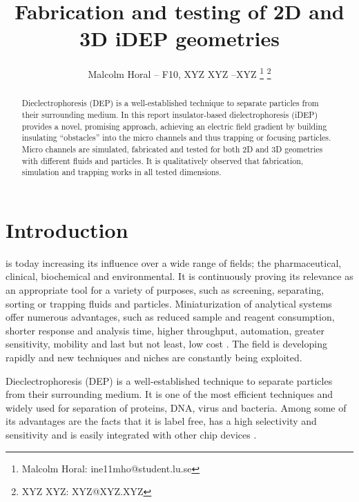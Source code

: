 \documentclass[journal, a4paper]{IEEEtran}
\begin{document}
	\title{Fabrication and testing of 2D and 3D iDEP geometries}
	\author{Malcolm Horal -- F10, XYZ XYZ --XYZ
	\thanks{Malcolm Horal: ine11mho@student.lu.se} \thanks{XYZ XYZ: XYZ@XYZ.XYZ}}
    
	\maketitle

\begin{abstract}
Dieclectrophoresis (DEP) is a well-established technique to separate particles from their surrounding medium. In this report insulator-based dielectrophoresis (iDEP) provides a novel, promising approach, achieving an electric field gradient by building insulating “obstacles” into the micro channels and thus trapping or focusing particles. Micro channels are simulated, fabricated and tested for both 2D and 3D geometries with different fluids and particles. It is qualitatively observed that fabrication, simulation and trapping works in all tested dimensions.
\end{abstract}

\section{Introduction}\label{sec:intro}
 is today increasing its influence over a wide range of fields; the pharmaceutical, clinical, biochemical and environmental. It is continuously proving its relevance as an appropriate tool for a variety of purposes, such as screening, separating, sorting or trapping fluids and particles. Miniaturization of analytical systems offer numerous advantages, such as reduced sample and reagent consumption, shorter response and analysis time, higher throughput, automation, greater sensitivity, mobility and last but not least, low cost \cite{mark2010,srivastava2011}. The field is developing rapidly and new techniques and niches are constantly being exploited.

Dieclectrophoresis (DEP) is a well-established technique to separate particles from their surrounding medium. It is one of the most efficient techniques and widely used for separation of proteins, DNA, virus and bacteria. Among some of its advantages are the facts that it is label free, has a high selectivity and sensitivity and is easily integrated with other chip devices \cite{cheri2014,martinez2009,srivastava2011}.
\end{document}
